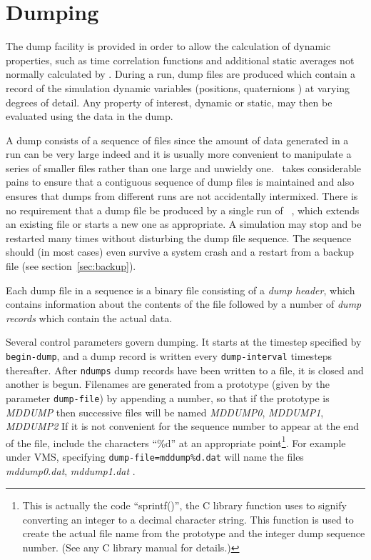 \section{Dumping}

The dump facility is provided in order to allow the calculation of
dynamic properties, such as time correlation functions and additional
static averages not normally calculated by \moldy.  During a run, dump
files are produced which contain a record of the simulation dynamic
variables (positions, quaternions \etc) at varying degrees of
detail.  Any property of interest, dynamic or static, may then be
evaluated using the data in the dump.

A dump consists of a sequence of files since the amount of data
generated in a run can be very large indeed and it is usually more
convenient to manipulate a series of smaller files rather than one
large and unwieldy one. \moldy\  takes considerable pains to ensure that
a contiguous sequence of dump files is maintained and also ensures
that dumps from different runs are not accidentally intermixed.  There
is no requirement that a dump file be produced by a single run of
\moldy\ , which extends an existing file or starts a new one as appropriate.
A simulation may stop and be restarted many times without
disturbing the dump file sequence.  The  sequence
should (in most cases) even survive a system crash and a restart from
a backup file (see section~\ref{sec:backup}).

Each dump file in a sequence is a binary file consisting of a {\em
dump header}, which contains information about the contents of the
file followed by a number of {\em dump records} which contain the
actual data.

Several control parameters govern dumping. It starts at the timestep
specified by \verb'begin-dump', and a dump record is written every
\verb'dump-interval' timesteps thereafter.  After \verb'ndumps' dump
records have been written to a file, it is closed and another is
begun. Filenames are generated from a prototype (given by the
parameter \verb'dump-file') by appending a number, so that if the
prototype is {\em MDDUMP} then successive files will be named
{\em MDDUMP0}, {\em MDDUMP1}, {\em MDDUMP2} \etc
If it is not convenient for the sequence number to appear at the end
of the file, include the characters ``\%d'' at an appropriate
point\footnote{This is actually the code ``sprintf()'', the C library
function uses to signify converting an integer to a decimal character
string. This function is used to create the actual file name from the
prototype and the integer dump sequence number. (See any C library
manual for details.)}.  For example under VMS, specifying
\verb'dump-file=mddump%d.dat' will name the files {\em mddump0.dat},
{\em mddump1.dat} \etc.


